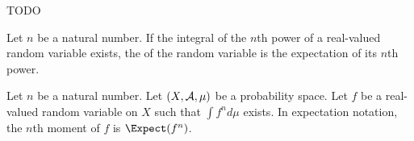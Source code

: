 
\sbasic























\sstart
{}


TODO


Let $n$ be a natural
number.
If the integral
of the $n$th power
of a real-valued
random variable exists,
the  of
the random variable
is the expectation
of its $n$th power.


Let $n$ be a natural number.
Let $(X, \mathcal{A}, \mu)$ be a
probability space.
Let $f$ be a real-valued
random variable on $X$ such that
$\int f^n d\mu$ exists.
In expectation notation,
the $n$th
moment of $f$ is
$\Expect(f^n)$.
\strats
